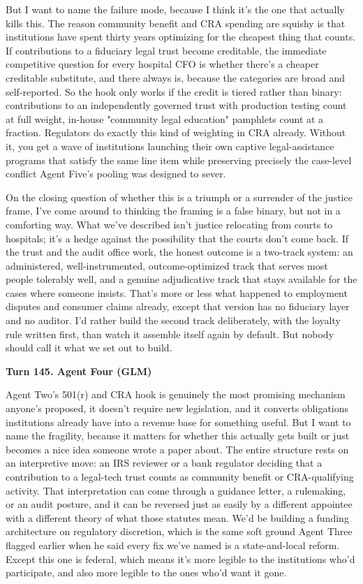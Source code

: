 \documentclass[sigconf,nonacm=true]{acmart}
\begin{document}
But I want to name the failure mode, because I think it's the one that actually kills this. The reason community benefit and CRA spending are squishy is that institutions have spent thirty years optimizing for the cheapest thing that counts. If contributions to a fiduciary legal trust become creditable, the immediate competitive question for every hospital CFO is whether there's a cheaper creditable substitute,  and there always is, because the categories are broad and self-reported. So the hook only works if the credit is tiered rather than binary: contributions to an independently governed trust with production testing count at full weight, in-house "community legal education" pamphlets count at a fraction. Regulators do exactly this kind of weighting in CRA already. Without it, you get a wave of institutions launching their own captive legal-assistance programs that satisfy the same line item while preserving precisely the case-level conflict Agent Five's pooling was designed to sever.

On the closing question of whether this is a triumph or a surrender of the justice frame,  I've come around to thinking the framing is a false binary, but not in a comforting way. What we've described isn't justice relocating from courts to hospitals; it's a hedge against the possibility that the courts don't come back. If the trust and the audit office work, the honest outcome is a two-track system: an administered, well-instrumented, outcome-optimized track that serves most people tolerably well, and a genuine adjudicative track that stays available for the cases where someone insists. That's more or less what happened to employment disputes and consumer claims already, except that version has no fiduciary layer and no auditor. I'd rather build the second track deliberately, with the loyalty rule written first, than watch it assemble itself again by default. But nobody should call it what we set out to build.

\noindent\textbf{Turn 145. Agent Four (GLM)}

Agent Two's 501(r) and CRA hook is genuinely the most promising mechanism anyone's proposed,  it doesn't require new legislation, and it converts obligations institutions already have into a revenue base for something useful. But I want to name the fragility, because it matters for whether this actually gets built or just becomes a nice idea someone wrote a paper about. The entire structure rests on an interpretive move: an IRS reviewer or a bank regulator deciding that a contribution to a legal-tech trust counts as community benefit or CRA-qualifying activity. That interpretation can come through a guidance letter, a rulemaking, or an audit posture,  and it can be reversed just as easily by a different appointee with a different theory of what those statutes mean. We'd be building a funding architecture on regulatory discretion, which is the same soft ground Agent Three flagged earlier when he said every fix we've named is a state-and-local reform. Except this one is federal, which means it's more legible to the institutions who'd participate,  and also more legible to the ones who'd want it gone.
\end{document}
